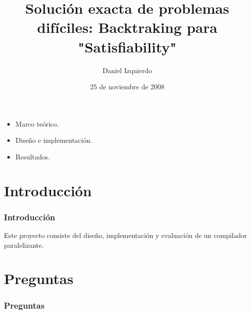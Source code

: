 \documentclass{beamer}
\begin{document}
\title{Solución exacta de problemas difíciles: Backtraking para "Satisfiability"}
\author{Daniel Izquierdo}
\date{25 de noviembre de 2008}

\frame{\titlepage}

\section[Contenido]{}
\frame
{
  \begin{itemize}
  \item Marco teórico.
  \item Diseño e implementación.
  \item Resultados.
  \end{itemize}
}

\section{Introducción}

\frame
{
  \frametitle{Introducción}

  Este proyecto consiste del diseño, implementación y evaluación de un
  compilador paralelizante.
}

\section{Preguntas}

\frame
{
  \frametitle{Preguntas}
}
\end{document}

